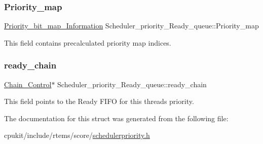 \subsubsection{\texorpdfstring{Priority\_map}{Priority\_map}}
{\footnotesize\ttfamily \mbox{\hyperlink{structPriority__bit__map__Information}{Priority\+\_\+bit\+\_\+map\+\_\+\+Information}} Scheduler\+\_\+priority\+\_\+\+Ready\+\_\+queue\+::\+Priority\+\_\+map}

This field contains precalculated priority map indices. \mbox{\label{structScheduler__priority__Ready__queue_a97778d923af23d1d05fd9963df8e8674}} 
\subsubsection{\texorpdfstring{ready\_chain}{ready\_chain}}
{\footnotesize\ttfamily \mbox{\hyperlink{unionChain__Control}{Chain\+\_\+\+Control}}$\ast$ Scheduler\+\_\+priority\+\_\+\+Ready\+\_\+queue\+::ready\+\_\+chain}

This field points to the Ready F\+I\+FO for this thread\textquotesingle{}s priority. 

The documentation for this struct was generated from the following file\+:\begin{DoxyCompactItemize}
\item 
cpukit/include/rtems/score/\mbox{\hyperlink{schedulerpriority_8h}{schedulerpriority.\+h}}\end{DoxyCompactItemize}
